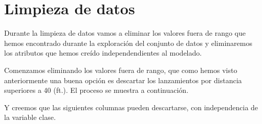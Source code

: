 \documentclass[
]{article}
\newenvironment{Shaded}{\begin{snugshade}}{\end{snugshade}}
\newcommand{\DecValTok}[1]{\textcolor[rgb]{0.00,0.00,0.81}{#1}}
\newcommand{\NormalTok}[1]{#1}
\newcommand{\OperatorTok}[1]{\textcolor[rgb]{0.81,0.36,0.00}{\textbf{#1}}}
\newcommand{\StringTok}[1]{\textcolor[rgb]{0.31,0.60,0.02}{#1}}
\begin{document}
\hypertarget{limpieza-de-datos}{%
\section{\texorpdfstring{\textbf{Limpieza de
datos}}{Limpieza de datos}}\label{limpieza-de-datos}}

Durante la limpieza de datos vamos a eliminar los valores fuera de rango
que hemos encontrado durante la exploración del conjunto de datos y
eliminaremos los atributos que hemos creído independendientes al
modelado.

Comenzamos eliminando los valores fuera de rango, que como hemos visto
anteriormente una buena opción es descartar los lanzamientos por
distancia superiores a 40 (ft.). El proceso se muestra a continuación.

\begin{Shaded}
\end{Shaded}

Y creemos que las siguientes columnas pueden descartarse, con
independencia de la variable clase.
\end{document}
